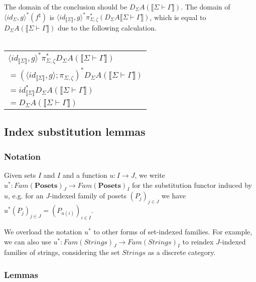 \documentclass{article}
\newcommand{\mbf}{\mathbf}
\newcommand{\sem}[1]{\llbracket #1 \rrbracket}
\newcommand{\sdisp}[1]{
\left( #1 \right)
}
\begin{document}
\subsubsection*{}

The domain of the conclusion should be $D_{\Sigma}A(\sem{\Sigma \vdash \Gamma})$. The domain of $\langle \mathit{id}_{\Sigma}, g \rangle^*(f^\sharp)$ is $\langle \mathit{id}_{\sem{\Sigma}}, g \rangle^* \pi_{\Sigma,\zeta}^*(D_{\Sigma} A \sem{\Sigma \vdash \Gamma})$, which is equal to $D_{\Sigma}A(\sem{\Sigma \vdash \Gamma})$ due to the following calculation.\\~\\
\begin{tabu}{l}
$\langle \mathit{id}_{\sem{\Sigma}}, g \rangle^* \pi_{\Sigma,\zeta}^* D_{\Sigma} A (\sem{\Sigma \vdash \Gamma})$ \\
$= (\langle \mathit{id}_{\sem{\Sigma}}, g \rangle; \pi_{\Sigma,\zeta})^* D_{\Sigma} A (\sem{\Sigma \vdash \Gamma})$ \\
$= id_{\sem{\Sigma}}^* D_{\Sigma} A (\sem{\Sigma \vdash \Gamma})$ \\
$= D_{\Sigma} A (\sem{\Sigma \vdash \Gamma})$
\end{tabu}

\subsection*{Index substitution lemmas}

\subsubsection*{Notation}

Given sets $I$ and $I$ and a function $u : I \to J$, we write $u^* : \mathit{Fam}(\mbf{Posets})_J \to \mathit{Fam}(\mbf{Posets})_I$ for the substitution functor induced by $u$, e.g. for an $J$-indexed family of posets $\sdisp{P_j}_{j \in J}$ we have $u^* \sdisp{P_j}_{j \in J} = \sdisp{ P_{u(i)} }_{i \in I}$.

We overload the notation $u^*$ to other forms of set-indexed families. For example, we can also use $u^* : \mathit{Fam}(\mathit{Strings})_J \to \mathit{Fam}(\mathit{Strings})_I$ to reindex $J$-indexed families of strings, considering the set $\mathit{Strings}$ as a discrete category. 

\subsubsection*{Lemmas}
\end{document}
